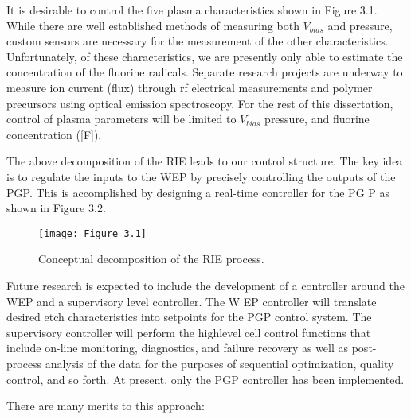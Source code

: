 It is desirable to control the five plasma characteristics shown in Figure 3.1. While there are well established methods of measuring both $V_{bias}$ and pressure, custom sensors are necessary for the measurement of the other characteristics. Unfortunately, of these characteristics, we are presently only able to estimate the concentration of the fluorine radicals. Separate research projects are underway to measure ion current (flux) through rf electrical measurements and polymer precursors using optical emission spectroscopy. For the rest of this dissertation, control of plasma parameters will be limited to $V_{bias}$ pressure, and fluorine concentration ([F]).


The above decomposition of the RIE leads to our control structure. The key idea is to regulate the inputs to the WEP by precisely controlling the outputs of the PGP. This is accomplished by designing a real-time controller for the PG P as shown in Figure 3.2.

\begin{figure}[H]
	\centering
	\texttt{[image: Figure 3.1]}
	\bf\caption{ Conceptual decomposition of the RIE process.}
	\label{fig:3.1}
\end{figure}


\noindent Future research is expected to include the development of a controller around the WEP and a supervisory level controller. The W EP controller will translate desired etch characteristics into setpoints for the PGP control system. The supervisory controller will perform the highlevel cell control functions that include on-line monitoring, diagnostics, and failure recovery as well as post-process analysis of the data for the purposes of sequential optimization, quality control, and so forth. At present, only the PGP controller has been implemented.

There are many merits to this approach:

